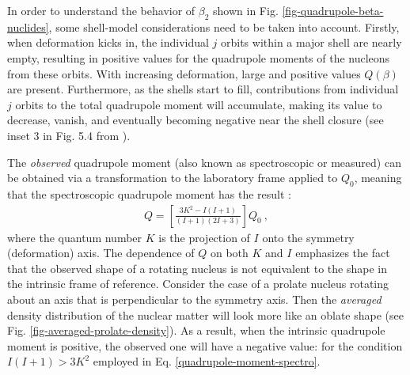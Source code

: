 In order to understand the behavior of $\beta_2$ shown in Fig. \ref{fig-quadrupole-beta-nuclides}, some shell-model considerations need to be taken into account. Firstly, when deformation kicks in, the individual $j$ orbits within a major shell are nearly empty, resulting in positive values for the quadrupole moments of the nucleons from these orbits. With increasing deformation, large and positive values $Q(\beta)$ are present. Furthermore, as the shells start to fill, contributions from individual $j$ orbits to the total quadrupole moment will accumulate, making its value to decrease, vanish, and eventually becoming negative near the shell closure (see inset 3 in Fig. 5.4 from \cite{casten2000nuclear}).

The \emph{observed} quadrupole moment (also known as spectroscopic or measured) can be obtained via a transformation to the laboratory frame applied to $Q_0$, meaning that the spectroscopic quadrupole moment has the result \cite{casten2000nuclear}:
\begin{align}
    Q=\left[\frac{3K^2-I(I+1)}{(I+1)(2I+3)}\right]Q_0\ ,
    \label{quadrupole-moment-spectro}
\end{align}
where the quantum number $K$ is the projection of $I$ onto the symmetry (deformation) axis. The dependence of $Q$ on both $K$ and $I$ emphasizes the fact that the observed shape of a rotating nucleus is not equivalent to the shape in the intrinsic frame of reference. Consider the case of a prolate nucleus rotating about an axis that is perpendicular to the symmetry axis. Then the \emph{averaged} density distribution of the nuclear matter will look more like an oblate shape (see Fig. \ref{fig-averaged-prolate-density}). As a result, when the intrinsic quadrupole moment is positive, the observed one will have a negative value: for the condition $I(I+1)>3K^2$ employed in Eq. \ref{quadrupole-moment-spectro}.
